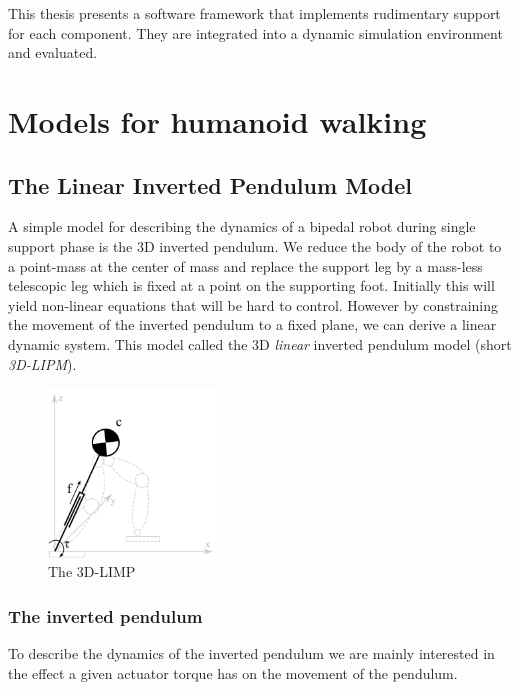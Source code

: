 \documentclass[english,ngerman]{KITreprt}
\begin{document}
This thesis presents a software framework that implements rudimentary
support for each component. They are integrated into a dynamic
simulation environment and evaluated.

\chapter{Models for humanoid walking}\label{section:walking-models}

\section{The Linear Inverted Pendulum
Model}\label{the-linear-inverted-pendulum-model}

A simple model for describing the dynamics of a bipedal robot during
single support phase is the 3D inverted pendulum. We reduce the body of
the robot to a point-mass at the center of mass and replace the support
leg by a mass-less telescopic leg which is fixed at a point on the
supporting foot. Initially this will yield non-linear equations that
will be hard to control. However by constraining the movement of the
inverted pendulum to a fixed plane, we can derive a linear dynamic
system. This model called the 3D \emph{linear} inverted pendulum model
(short \emph{3D-LIPM}).

\begin{figure}
  \begin{center}
     \includegraphics[width=0.4\textwidth]{images/3dlimp.png}
  \end{center}
  \caption{The 3D-LIMP}
\end{figure}

\subsection{The inverted pendulum}\label{the-inverted-pendulum}

To describe the dynamics of the inverted pendulum we are mainly
interested in the effect a given actuator torque has on the movement of
the pendulum.
\end{document}
